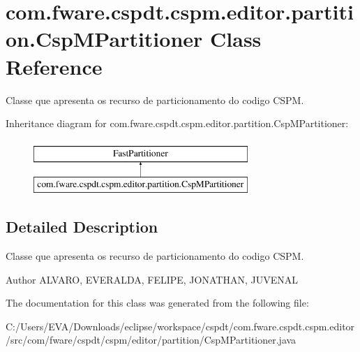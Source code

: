 \hypertarget{classcom_1_1fware_1_1cspdt_1_1cspm_1_1editor_1_1partition_1_1_csp_m_partitioner}{}\section{com.\+fware.\+cspdt.\+cspm.\+editor.\+partition.\+Csp\+M\+Partitioner Class Reference}
\label{classcom_1_1fware_1_1cspdt_1_1cspm_1_1editor_1_1partition_1_1_csp_m_partitioner}


Classe que apresenta os recurso de particionamento do codigo C\+S\+PM.  


Inheritance diagram for com.\+fware.\+cspdt.\+cspm.\+editor.\+partition.\+Csp\+M\+Partitioner\+:\begin{figure}[H]
\begin{center}
\leavevmode
\includegraphics[height=2.000000cm]{classcom_1_1fware_1_1cspdt_1_1cspm_1_1editor_1_1partition_1_1_csp_m_partitioner}
\end{center}
\end{figure}


\subsection{Detailed Description}
Classe que apresenta os recurso de particionamento do codigo C\+S\+PM. 

\begin{DoxyAuthor}{Author}
A\+L\+V\+A\+RO, E\+V\+E\+R\+A\+L\+DA, F\+E\+L\+I\+PE, J\+O\+N\+A\+T\+H\+AN, J\+U\+V\+E\+N\+AL 
\end{DoxyAuthor}


The documentation for this class was generated from the following file\+:\begin{DoxyCompactItemize}
\item 
C\+:/\+Users/\+E\+V\+A/\+Downloads/eclipse/workspace/cspdt/com.\+fware.\+cspdt.\+cspm.\+editor/src/com/fware/cspdt/cspm/editor/partition/Csp\+M\+Partitioner.\+java\end{DoxyCompactItemize}
